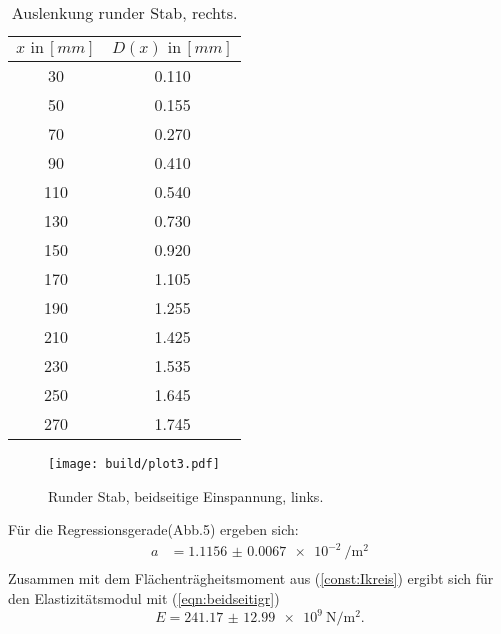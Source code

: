 \begin{table}[h]
  \centering
  \label{tab:5}
  \begin{tabular}{ c c }
    \toprule
    $x \,\, \text{in} \, [mm]$
   &{$D(x) \,\, \text{in} \, [mm]$}\\

    \midrule
    30  & 0.110 \\%
    50  & 0.155 \\%
    70  & 0.270 \\%
    90  & 0.410 \\%
    110 & 0.540 \\%
    130 & 0.730 \\%
    150 & 0.920 \\%
    170 & 1.105 \\%
    190 & 1.255 \\%
    210 & 1.425 \\%
    230 & 1.535 \\%
    250 & 1.645 \\%
    270 & 1.745 \\%

    \bottomrule
  \end{tabular}
  \caption{Auslenkung runder Stab, rechts.}
\end{table}

\begin{figure}
  \centering
  \texttt{[image: build/plot3.pdf]}
  \caption{Runder Stab, beidseitige Einspannung, links.}
  \label{fig:plot3}
\end{figure}
Für die Regressionsgerade(Abb.5) ergeben sich:
\begin{align*}
  a &= \SI{1.1156(67)e-2}{\per\square\meter} \\
\end{align*}
Zusammen mit dem Flächenträgheitsmoment aus (\ref{const:Ikreis})
ergibt sich für den Elastizitätsmodul mit (\ref{eqn:beidseitigr})
\begin{equation*}
  E = \SI{241.17(1299)e9}{\newton\per\square\meter} .
\end{equation*}
\newpage

